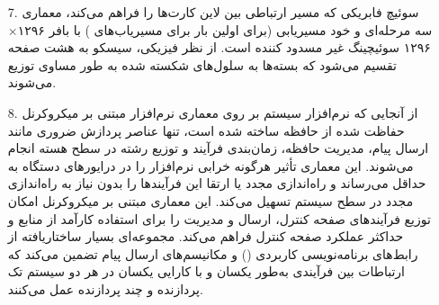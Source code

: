 \begin{qsolve}
\begin{enumerate}
		\item [7.]
		سوئیچ فابریکی که مسیر ارتباطی بین لاین کارت‌ها را فراهم می‌کند، معماری  سه مرحله‌ای و خود مسیریابی (برای اولین بار برای مسیریاب‌های ) با بافر ۱۲۹۶$\times$۱۲۹۶ سوئیچینگ غیر مسدود کننده است. از نظر فیزیکی، سیسکو  به هشت صفحه تقسیم می‌شود که بسته‌ها به سلول‌های شکسته شده به طور مساوی توزیع می‌شوند.
		\item [8.]
		از آنجایی که نرم‌افزار سیستم  بر روی معماری نرم‌افزار مبتنی بر میکروکرنل حفاظت شده از حافظه ساخته شده است، تنها عناصر پردازش ضروری مانند ارسال پیام، مدیریت حافظه، زمان‌بندی فرآیند و توزیع رشته در سطح هسته انجام می‌شوند. این معماری تأثیر هرگونه خرابی نرم‌افزار را در درایورهای دستگاه به حداقل می‌رساند و راه‌اندازی مجدد یا ارتقا این فرآیند‌ها را بدون نیاز به راه‌اندازی مجدد در سطح سیستم تسهیل می‌کند. این معماری مبتنی بر میکروکرنل امکان توزیع فرآیندهای صفحه کنترل، ارسال و مدیریت را برای استفاده کارآمد از منابع و حداکثر عملکرد صفحه کنترل فراهم می‌کند. مجموعه‌ای بسیار ساختاریافته از رابط‌های برنامه‌نویسی کاربردی () و مکانیسم‌های ارسال پیام تضمین می‌کند که ارتباطات بین فرآیندی به‌طور یکسان و با کارایی یکسان در هر دو سیستم تک پردازنده و چند پردازنده عمل می‌کنند.
		
	\end{enumerate}
\end{qsolve}


